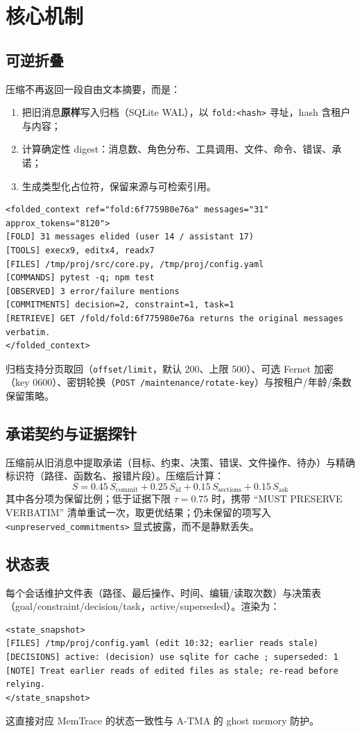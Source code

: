 \documentclass[11pt,a4paper]{ctexart}
\begin{document}
\section{核心机制}

\subsection{可逆折叠}
压缩不再返回一段自由文本摘要，而是：
\begin{enumerate}
  \item 把旧消息\textbf{原样}写入归档（SQLite WAL），以 \texttt{fold:<hash>} 寻址，hash 含租户与内容；
  \item 计算确定性 digest：消息数、角色分布、工具调用、文件、命令、错误、承诺；
  \item 生成类型化占位符，保留来源与可检索引用。
\end{enumerate}

\begin{lstlisting}
<folded_context ref="fold:6f775980e76a" messages="31" approx_tokens="8120">
[FOLD] 31 messages elided (user 14 / assistant 17)
[TOOLS] execx9, editx4, readx7
[FILES] /tmp/proj/src/core.py, /tmp/proj/config.yaml
[COMMANDS] pytest -q; npm test
[OBSERVED] 3 error/failure mentions
[COMMITMENTS] decision=2, constraint=1, task=1
[RETRIEVE] GET /fold/fold:6f775980e76a returns the original messages verbatim.
</folded_context>
\end{lstlisting}

归档支持分页取回（\texttt{offset/limit}，默认 200、上限 500）、可选 Fernet 加密（key 0600）、密钥轮换（\texttt{POST /maintenance/rotate-key}）与按租户/年龄/条数保留策略。

\subsection{承诺契约与证据探针}
压缩前从旧消息中提取承诺（目标、约束、决策、错误、文件操作、待办）与精确标识符（路径、函数名、报错片段）。压缩后计算：
\begin{equation}
S = 0.45\,S_{\text{commit}} + 0.25\,S_{\text{id}} + 0.15\,S_{\text{sections}} + 0.15\,S_{\text{ask}}
\end{equation}
其中各分项为保留比例；低于证据下限 $\tau=0.75$ 时，携带 “MUST PRESERVE VERBATIM” 清单重试一次，取更优结果；仍未保留的项写入 \texttt{<unpreserved\_commitments>} 显式披露，而不是静默丢失。

\subsection{状态表}
每个会话维护文件表（路径、最后操作、时间、编辑/读取次数）与决策表（goal/constraint/decision/task，active/superseded）。渲染为：
\begin{lstlisting}
<state_snapshot>
[FILES] /tmp/proj/config.yaml (edit 10:32; earlier reads stale)
[DECISIONS] active: (decision) use sqlite for cache ; superseded: 1
[NOTE] Treat earlier reads of edited files as stale; re-read before relying.
</state_snapshot>
\end{lstlisting}
这直接对应 MemTrace 的状态一致性与 A-TMA 的 ghost memory 防护。
\end{document}
